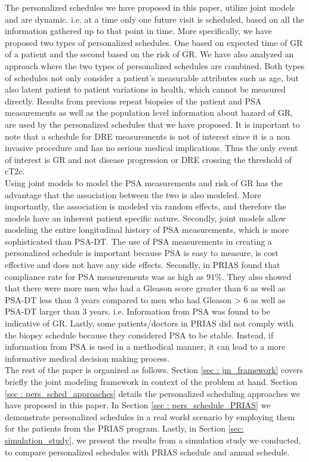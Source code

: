 The personalized schedules we have proposed in this paper, utilize joint models and are dynamic. i.e. at a time only one future visit is scheduled, based on all the information gathered up to that point in time. More specifically, we have proposed two types of personalized schedules. One based on expected time of GR of a patient and the second based on the risk of GR. We have also analyzed an approach where the two types of personalized schedules are combined. Both types of schedules not only consider a patient's measurable attributes such as age, but also latent patient to patient variations in health, which cannot be measured directly. Results from previous repeat biopsies of the patient and PSA measurements as well as the population level information about hazard of GR, are used by the personalized schedules that we have proposed. It is important to note that a schedule for DRE measurements is not of interest since it is a non invasive procedure and has no serious medical implications. Thus the only event of interest is GR and not disease progression or DRE crossing the threshold of cT2c.\\

Using joint models to model the PSA measurements and risk of GR has the advantage that the association between the two is also modeled. More importantly, the association is modeled via random effects, and therefore the models have an inherent patient specific nature. Secondly, joint models allow modeling the entire longitudinal history of PSA measurements, which is more sophisticated than PSA-DT. The use of PSA measurements in creating a personalized schedule is important because PSA is easy to measure, is cost effective and does not have any side effects. Secondly, in PRIAS \cite{bokhorst2015compliance} found that compliance rate for PSA measurements was as high as 91\%. They also showed that there were more men who had a Gleason score greater than 6 as well as PSA-DT less than 3 years compared to men who had Gleason > 6 as well as PSA-DT larger than 3 years. i.e. Information from PSA was found to be indicative of GR. Lastly, some patients/doctors in PRIAS did not comply with the biopsy schedule because they considered PSA to be stable. Instead, if information from PSA is used in a methodical manner, it can lead to a more informative medical decision making process.\\

The rest of the paper is organized as follows. Section \ref{sec : jm_framework} covers briefly the joint modeling framework in context of the problem at hand. Section \ref{sec : pers_sched_approaches} details the personalized scheduling approaches we have proposed in this paper. In Section \ref{sec : pers_schedule_PRIAS} we demonstrate personalized schedules in a real world scenario by employing them for the patients from the PRIAS program. Lastly, in Section \ref{sec: simulation_study}, we present the results from a simulation study we conducted, to compare personalized schedules with PRIAS schedule and annual schedule.